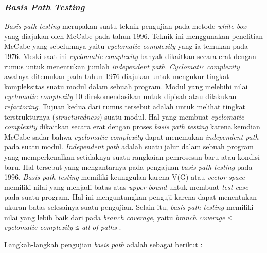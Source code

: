 \subsubsection{\emph{Basis Path Testing}}

\emph{Basis path testing} merupakan suatu teknik pengujian pada metode
\emph{white-box} yang diajukan oleh McCabe pada tahun 1996. Teknik ini
menggunakan penelitian McCabe yang sebelumnya yaitu \emph{cyclomatic
complexity} yang ia temukan pada 1976. Meski saat ini \emph{cyclomatic
complexity} banyak dikaitkan secara erat dengan rumus untuk menentukan
jumlah \emph{independent path}. \emph{Cyclomatic complexity} awalnya
ditemukan pada tahun 1976 diajukan untuk mengukur tingkat kompleksitas
suatu modul dalam sebuah program. Modul yang melebihi nilai
\emph{cyclomatic complexity} 10 direkomendasikan untuk dipisah atau
dilakukan \emph{refactoring}. Tujuan kedua dari rumus tersebut adalah
untuk melihat tingkat terstrukturnya (\emph{structuredness}) suatu
modul. Hal yang membuat \emph{cyclomatic complexity} dikaitkan secara
erat dengan proses \emph{basis path testing} karena kemdian McCabe
sadar bahwa \emph{cyclomatic complexity} dapat menemukan
\emph{independent path} pada suatu modul. \emph{Independent path} adalah
suatu jalur dalam sebuah program yang memperkenalkan setidaknya suatu rangkaian
pemrosesan baru atau kondisi baru. Hal tersebut yang
mengantarnya pada pengajuan \emph{basis path testing} pada 1996.
\emph{Basis path testing} memiliki keunggulan karena V(G) atau
\emph{vector space} memiliki nilai yang menjadi batas atas \emph{upper
bound} untuk membuat \emph{test-case} pada suatu program. Hal ini
menguntungkan penguji karena dapat menentukan ukuran batas selesainya
suatu pengujian. Selain itu, \emph{basis path testing} memiliki nilai
yang lebih baik dari pada \emph{branch coverage}, yaitu \emph{branch
coverage ≤ cyclomatic complexity ≤ all of paths}
\parencite{gregory2007path}.

Langkah-langkah pengujian \emph{basis path} adalah sebagai berikut
\parencite{presman2010software}:

